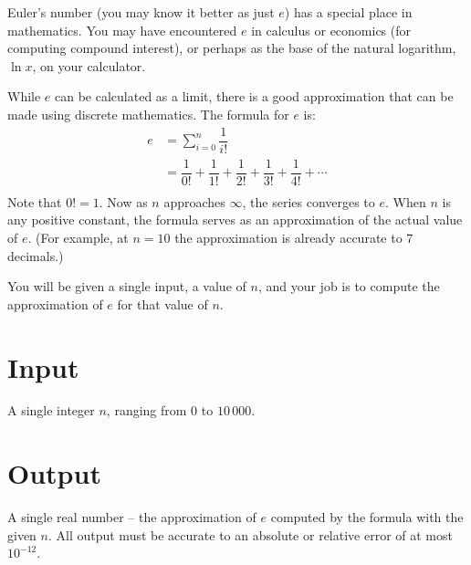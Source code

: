 
Euler’s number (you may know it better as just $e$) has a special place in mathematics. You may have encountered $e$ in calculus or economics (for computing compound interest), or perhaps as the base of the natural logarithm, $\ln{x}$, on your calculator.

While $e$ can be calculated as a limit, there is a good approximation that can be made using discrete mathematics. The formula for $e$ is:
\begin{align*}
e &= \displaystyle\sum_{i=0}^n\dfrac{1}{i!}\\
&= \dfrac{1}{0!} +\dfrac{1}{1!} +\dfrac{1}{2!}+\dfrac{1}{3!}+\dfrac{1}{4!} + \cdots\\
\end{align*}
Note that $0! = 1$. Now as $n$ approaches $\infty$, the series converges to $e$. When $n$ is any positive constant, the formula serves as an approximation of the actual value of $e$.  (For example, at $n=10$ the approximation is already accurate to $7$ decimals.)

You will be given a single input, a value of $n$, and your job is to compute the approximation of $e$ for that value of $n$.

\section*{Input}
A single integer $n$, ranging from $0$ to $10\,000$.

\section*{Output}
A single real number -- the approximation of $e$ computed by the formula with the given $n$. All output must be accurate to an absolute or relative error of at most $10^{-12}$.
